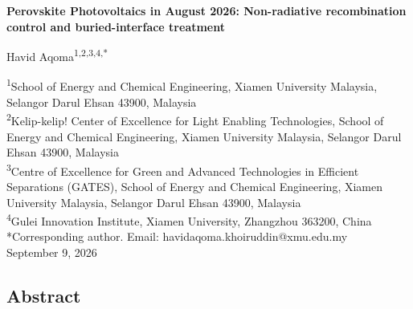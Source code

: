 \documentclass[
  11pt,
]{article}
\author{}
\date{}
\begin{document}
\begin{center}
{\LARGE\bfseries Perovskite Photovoltaics in August 2026: Non-radiative recombination control and buried-interface treatment\par}
\vspace{1.1em}
{\large Havid Aqoma\textsuperscript{1,2,3,4,*}\par}
\vspace{0.7em}
\begin{minipage}{\textwidth}\centering\small
\textsuperscript{1}School of Energy and Chemical Engineering, Xiamen University Malaysia, Selangor Darul Ehsan 43900, Malaysia\\[0.25em]
\textsuperscript{2}Kelip-kelip! Center of Excellence for Light Enabling Technologies, School of Energy and Chemical Engineering, Xiamen University Malaysia, Selangor Darul Ehsan 43900, Malaysia\\[0.25em]
\textsuperscript{3}Centre of Excellence for Green and Advanced Technologies in Efficient Separations (GATES), School of Energy and Chemical Engineering, Xiamen University Malaysia, Selangor Darul Ehsan 43900, Malaysia\\[0.25em]
\textsuperscript{4}Gulei Innovation Institute, Xiamen University, Zhangzhou 363200, China\\[0.55em]
*Corresponding author. Email: havidaqoma.khoiruddin@xmu.edu.my\\[2.0em]
September 9, 2026
\end{minipage}
\end{center}
\vspace{0.8em}

\subsection{Abstract}\label{abstract}
\end{document}
